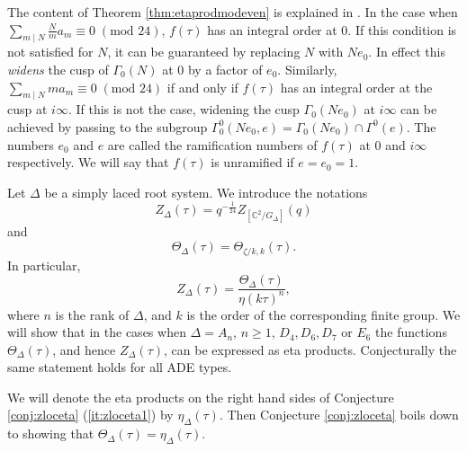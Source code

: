 \documentclass{article}
\theoremstyle{definition}
\newtheorem{example}[theorem]{Example}
\newcommand{\CC} {{\mathbb C}}          %
\begin{document}

The content of Theorem \ref{thm:etaprodmodeven} is explained in \cite[Section 1]{gordon1989multiplicative}. 
In the case when $\sum_{m \mid N} \frac{N}{m}a_m \equiv 0 \;(\textrm{mod }24)$, $f(\tau)$ has an integral order at 0. If this condition is not satisfied for $N$, it can be guaranteed by replacing $N$ with $Ne_0$. In effect this \emph{widens} the cusp of $\Gamma_0(N)$ at 0 by a factor of $e_0$. Similarly,  $\sum_{m \mid N} ma_m \equiv 0 \;(\textrm{mod }24)$ if and only if $f(\tau)$ has an integral order at the cusp at $i\infty$. If this is not the case, widening the cusp $\Gamma_0(Ne_0)$ at $i\infty$ can be achieved by passing to the subgroup $\Gamma_0^0(Ne_0,e)=\Gamma_0(Ne_0) \cap \Gamma^0(e)$. The numbers $e_0$ and $e$ are called the ramification numbers of $f(\tau)$ at $0$ and $i\infty$ respectively. We will say that $f(\tau)$ is unramified if $e=e_0=1$.





Let $\Delta$ be a simply laced root system. We introduce the notations
\[ Z_{\Delta}(\tau)=q^{-\frac{1}{24}}Z_{[\CC^2/G_\Delta]}(q)  \]
and 
\[  \Theta_{\Delta}(\tau)=\Theta_{ \zeta/k ,k}(\tau ). \]
In particular,
\[ Z_{\Delta}(\tau)=\frac{\Theta_{\Delta}(\tau)}{\eta(k\tau)^n}, \]
where $n$ is the rank of $\Delta$, and $k$ is the order of the corresponding finite group.
We will show that in the cases when $\Delta=A_n$, $n\geq 1$, $D_4, D_6, D_7$ or $E_6$ the functions $\Theta_{\Delta}(\tau)$, and hence $Z_{\Delta}(\tau)$, can be expressed as eta products. Conjecturally the same statement holds for all ADE types.


We will denote the eta products on the right hand sides of Conjecture \ref{conj:zloceta} (\ref{it:zloceta1}) by $\eta_{\Delta}(\tau)$. Then Conjecture \ref{conj:zloceta} boils down to showing that $\Theta_{\Delta}(\tau)=\eta_{\Delta}(\tau)$. 
\end{document}
